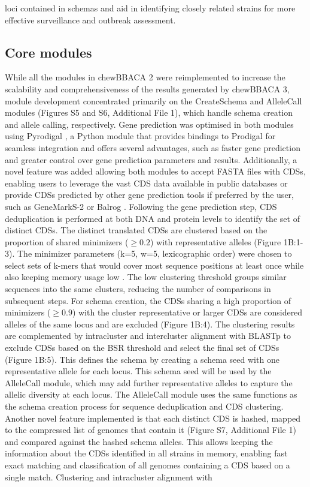 loci contained in schemas and aid in identifying closely related strains for more effective surveillance and outbreak assessment.

\subsection{Core modules} \label{ssec:core_modules}

While all the modules in chewBBACA 2 were reimplemented to increase the scalability and comprehensiveness of the results generated by chewBBACA 3, module development concentrated primarily on the CreateSchema and AlleleCall modules (Figures S5 and S6, Additional File 1), which handle schema creation and allele calling, respectively. Gene prediction was optimised in both modules using Pyrodigal \citep{larralde_pyrodigal_2022, hyatt_prodigal_2010}, a Python module that provides bindings to Prodigal for seamless integration and offers several advantages, such as faster gene prediction and greater control over gene prediction parameters and results. Additionally, a novel feature was added allowing both modules to accept FASTA files with CDSs, enabling users to leverage the vast CDS data available in public databases or provide CDSs predicted by other gene prediction tools if preferred by the user, such as GeneMarkS-2 or Balrog \citep{lomsadze_modeling_2018, sommer_balrog_2021}. Following the gene prediction step, CDS deduplication is performed at both DNA and protein levels to identify the set of distinct CDSs. The distinct translated CDSs are clustered based on the proportion of shared minimizers ($\geq0.2$) with representative alleles \citep{schleimer_winnowing_nodate, roberts_reducing_2004, marcais_improving_2017} (Figure 1B:1-3). The minimizer parameters (k=5, w=5, lexicographic order) were chosen to select sets of k-mers that would cover most sequence positions at least once while also keeping memory usage low \citep{zheng_improved_2020}. The low clustering threshold groups similar sequences into the same clusters, reducing the number of comparisons in subsequent steps. For schema creation, the CDSs sharing a high proportion of minimizers ($\geq0.9$) with the cluster representative or larger CDSs are considered alleles of the same locus and are excluded (Figure 1B:4). The clustering results are complemented by intracluster and intercluster alignment with BLASTp to exclude CDSs based on the BSR threshold and select the final set of CDSs (Figure 1B:5). This defines the schema by creating a schema seed with one representative allele for each locus. This schema seed will be used by the AlleleCall module, which may add further representative alleles to capture the allelic diversity at each locus. The AlleleCall module uses the same functions as the schema creation process for sequence deduplication and CDS clustering. Another novel feature implemented is that each distinct CDS is hashed, mapped to the compressed list of genomes that contain it (Figure S7, Additional File 1) and compared against the hashed schema alleles. This allows keeping the information about the CDSs identified in all strains in memory, enabling fast exact matching and classification of all genomes containing a CDS based on a single match. Clustering and intracluster alignment with 
